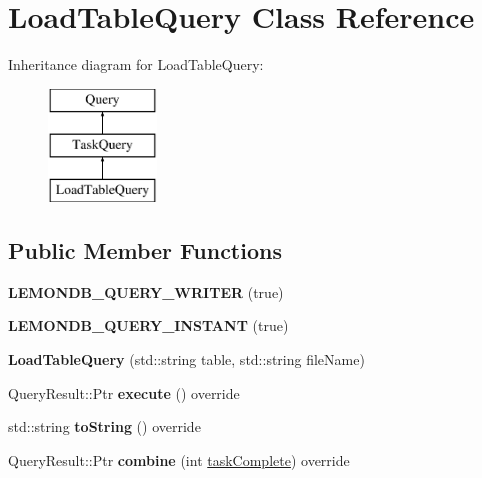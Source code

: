 \hypertarget{class_load_table_query}{}\section{Load\+Table\+Query Class Reference}
\label{class_load_table_query}
Inheritance diagram for Load\+Table\+Query\+:\begin{figure}[H]
\begin{center}
\leavevmode
\includegraphics[height=3.000000cm]{class_load_table_query}
\end{center}
\end{figure}
\subsection*{Public Member Functions}
\begin{DoxyCompactItemize}
\item 
\mbox{\label{class_load_table_query_ac9169ab007b7027839ee5ac626f1f67b}} 
{\bfseries L\+E\+M\+O\+N\+D\+B\+\_\+\+Q\+U\+E\+R\+Y\+\_\+\+W\+R\+I\+T\+ER} (true)
\item 
\mbox{\label{class_load_table_query_a2dfec4579872e5fe8793d0760ad07547}} 
{\bfseries L\+E\+M\+O\+N\+D\+B\+\_\+\+Q\+U\+E\+R\+Y\+\_\+\+I\+N\+S\+T\+A\+NT} (true)
\item 
\mbox{\label{class_load_table_query_a2638e62922f0daff93916b32a6caa4f1}} 
{\bfseries Load\+Table\+Query} (std\+::string table, std\+::string file\+Name)
\item 
\mbox{\label{class_load_table_query_a699ce5f313ee96d7f844fd860259812e}} 
Query\+Result\+::\+Ptr {\bfseries execute} () override
\item 
\mbox{\label{class_load_table_query_a8f8cf237bb4cd6482147b8288c161b50}} 
std\+::string {\bfseries to\+String} () override
\item 
\mbox{\label{class_load_table_query_a64c8e36738ba0d3a85cbe9b8a7c88221}} 
Query\+Result\+::\+Ptr {\bfseries combine} (int \hyperlink{class_task_query_a3dc3e4c56ddea8ff025239fd9da358d3}{task\+Complete}) override
\end{DoxyCompactItemize}
